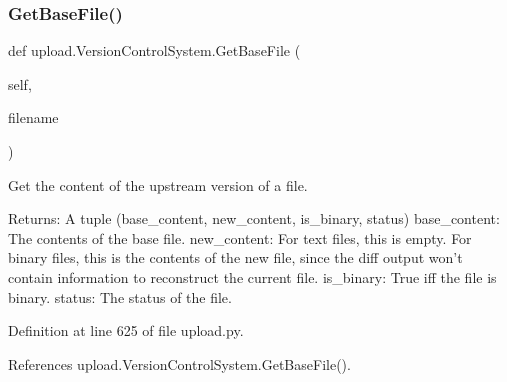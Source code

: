 \subsubsection{\texorpdfstring{Get\+Base\+File()}{GetBaseFile()}\hspace{0.1cm}{\footnotesize\ttfamily [2/2]}}
{\footnotesize\ttfamily def upload.\+Version\+Control\+System.\+Get\+Base\+File (\begin{DoxyParamCaption}\item[{}]{self,  }\item[{}]{filename }\end{DoxyParamCaption})}

\begin{DoxyVerb}Get the content of the upstream version of a file.

Returns:
  A tuple (base_content, new_content, is_binary, status)
base_content: The contents of the base file.
new_content: For text files, this is empty.  For binary files, this is
  the contents of the new file, since the diff output won't contain
  information to reconstruct the current file.
is_binary: True iff the file is binary.
status: The status of the file.
\end{DoxyVerb}
 

Definition at line 625 of file upload.\+py.



References upload.\+Version\+Control\+System.\+Get\+Base\+File().


